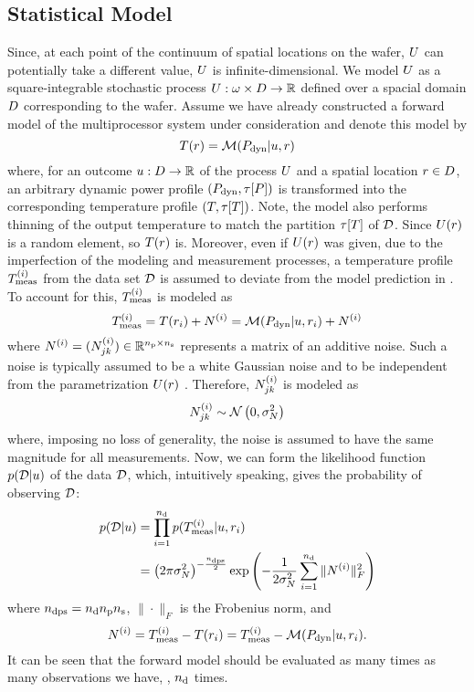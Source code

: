 \subsection{Statistical Model}
Since, at each point of the continuum of spatial locations on the wafer, $U$ can potentially take a different value, $U$ is infinite-dimensional. We model $U$ as a square-integrable stochastic process $U: \omega \times D \to \mathbb{R}$ defined over a spacial domain $D$ corresponding to the wafer. Assume we have already constructed a forward model of the multiprocessor system under consideration and denote this model by
\begin{equation} \elabel{model}
  \mT(\r) = \model{\mP_\dyn | \u, \r}
\end{equation}
where, for an outcome $u: D \to \mathbb{R}$ of the process $U$ and a spatial location $r \in D$, an arbitrary dynamic power profile $(P_{\text{dyn}}, \tau[P])$ is transformed into the corresponding temperature profile $\profileT$. Note, the model also performs thinning of the output temperature to match the partition $\tau[T]$ of $\mathcal{D}$. Since $U(r)$ is a random element, so $T(r)$ is. Moreover, even if $U(r)$ was given, due to the imperfection of the modeling and measurement processes, a temperature profile $T^{(i)}_{\text{meas}}$ from the data set $\mathcal{D}$ is assumed to deviate from the model prediction in . To account for this, $T^{(i)}_{\text{meas}}$ is modeled as
\[
  T^{(i)}_{\text{meas}} = T(r_i) + N^{(i)} = \mathcal{M}( P_{\text{dyn}} | u, r_i ) + N^{(i)}
\]
where $N^{(i)} = (N^{(i)}_{jk}) \in \mathbb{R}^{{n_\text{p}} \times {n_\text{s}}}$ represents a matrix of an additive noise. Such a noise is typically assumed to be a white Gaussian noise and to be independent from the parametrization $U(r)$ \cite{marzouk2007, el-moselhy2012}. Therefore, $N^{(i)}_{jk}$ is modeled as
\[
  N^{(i)}_{jk} \sim \mathcal{N}\left(0, \sigma^2_N\right)
\]
where, imposing no loss of generality, the noise is assumed to have the same magnitude for all measurements. Now, we can form the likelihood function $\f{\data | \u}$ of the data $\mathcal{D}$, which, intuitively speaking, gives the probability of observing $\mathcal{D}$:
\begin{align*}
  \f{\data | \u} & = \prod_{i = 1}^{\ndata} \f{\mT^{(i)}_\meas | \u, \r_i} \\
  & = \left(2 \pi \sigma_\noise^2\right)^{-\frac{\ndcs}{2}} \exp\left( -\frac{1}{2 \sigma^2_\noise} \sum_{i = 1}^\ndata \| \mnoise^{(i)} \|_F^2 \right)
\end{align*}
where ${n_\text{dps}} = {n_\text{d}} {n_\text{p}} {n_\text{s}}$, $\| \cdot \|_F$ is the Frobenius norm, and
\[
  N^{(i)} = T^{(i)}_{\text{meas}} - T(r_i) = T^{(i)}_{\text{meas}} - \mathcal{M}( P_{\text{dyn}} | u, r_i ).
\]
It can be seen that the forward model should be evaluated as many times as many observations we have, \ie, ${n_\text{d}}$ times.

